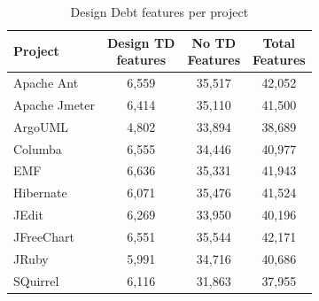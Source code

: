 \begin{table}[!hbt]
    \begin{center}
        \caption{Design Debt features per project}
        \label{tbl:design_features_per_project}
        \begin{tabular}{l| c c c }
        \toprule
        \textbf{Project} & \thead{Design TD\\features} & \thead{No TD\\Features} & \thead{Total\\Features} \\
        \midrule
        Apache Ant    &  6,559 & 35,517 & 42,052  \\
        Apache Jmeter &  6,414 & 35,110 & 41,500  \\
        ArgoUML       &  4,802 & 33,894 & 38,689  \\
        Columba       &  6,555 & 34,446 & 40,977  \\
        EMF           &  6,636 & 35,331 & 41,943  \\
        Hibernate     &  6,071 & 35,476 & 41,524  \\
        JEdit         &  6,269 & 33,950 & 40,196  \\
        JFreeChart    &  6,551 & 35,544 & 42,171  \\
        JRuby         &  5,991 & 34,716 & 40,686  \\
        SQuirrel      &  6,116 & 31,863 & 37,955  \\
        \bottomrule
        \end{tabular}
    \end{center}    
\end{table}

